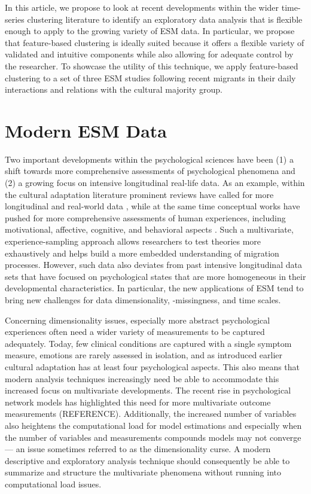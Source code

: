 \documentclass[man, 12pt, a4paper]{apa7}
\theoremstyle{break}
\theoremstyle{plain}
\begin{document}
In this article, we propose to look at recent developments within the wider time-series clustering literature to identify an exploratory data analysis that is flexible enough to apply to the growing variety of ESM data. In particular, we propose that feature-based clustering is ideally suited because it offers a flexible variety of validated and intuitive components while also allowing for adequate control by the researcher. To showcase the utility of this technique, we apply feature-based clustering to a set of three ESM studies following recent migrants in their daily interactions and relations with the cultural majority group. 

\section{Modern ESM Data}
Two important developments within the psychological sciences have been (1) a shift towards more comprehensive assessments of psychological phenomena and (2) a growing focus on intensive longitudinal real-life data. As an example, within the cultural adaptation literature prominent reviews have called for more longitudinal \citep[e.g.,][]{Ward2019} and real-world data \citep[e.g.,][]{McKeown2017}, while at the same time conceptual works have pushed for more comprehensive assessments of human experiences, including motivational, affective, cognitive, and behavioral aspects \citep[e.g.,][]{Kreienkamp2022d}. Such a multivariate, experience-sampling approach allows researchers to test theories more exhaustively and helps build a more embedded understanding of migration processes. However, such data also deviates from past intensive longitudinal data sets that have focused on psychological states that are more homogeneous in their developmental characteristics. In particular, the new applications of ESM tend to bring new challenges for data dimensionality, -missingness, and time scales. 

Concerning dimensionality issues, especially more abstract psychological experiences often need a wider variety of measurements to be captured adequately. Today, few clinical conditions are captured with a single symptom measure, emotions are rarely assessed in isolation, and as introduced earlier cultural adaptation has at least four psychological aspects. This also means that modern analysis techniques increasingly need be able to accommodate this increased focus on multivariate developments. The recent rise in psychological network models has highlighted this need for more multivariate outcome measurements (REFERENCE). Additionally, the increased number of variables also heightens the computational load for model estimations and especially when the number of variables and measurements compounds models may not converge --- an issue sometimes referred to as the dimensionality curse. A modern descriptive and exploratory analysis technique should consequently be able to summarize and structure the multivariate phenomena without running into computational load issues.
\end{document}
